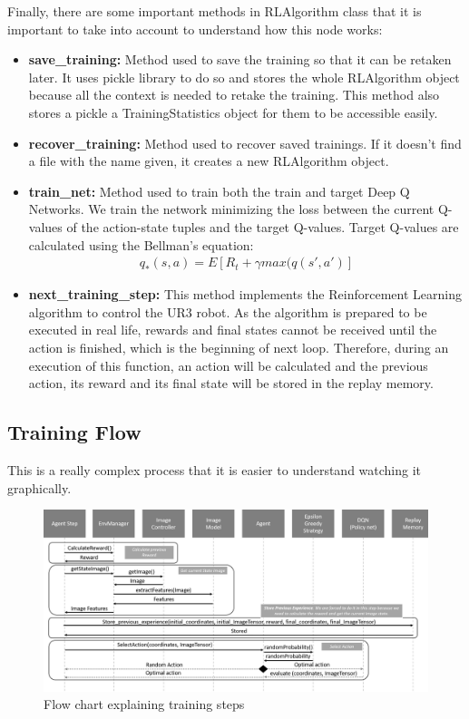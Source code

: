 				Finally, there are some important methods in RLAlgorithm class that it is important to take into account to understand how this node works:
				
				\begin{itemize}
					\item[\textendash]\textbf{save\_training:} Method used to save the training so that it can be retaken later. It uses pickle library to do so and stores the whole RLAlgorithm object because all the context is needed to retake the training. This method also stores a pickle a TrainingStatistics object for them to be accessible easily.
					\item[\textendash]\textbf{recover\_training:} Method used to recover saved trainings. If it doesn't find a file with the name given, it creates a new RLAlgorithm object.
					\item[\textendash]\textbf{train\_net:} Method used to train both the train and target Deep Q Networks. We train the network minimizing the loss between the current Q-values of the action-state tuples and the target Q-values. Target Q-values are calculated using the Bellman's equation:
					\begin{gather*}
						q_*(s,a) = E[ R_t + \gamma max(q(s', a' )]
					\end{gather*}
					\item[\textendash]\textbf{next\_training\_step:} This method implements the Reinforcement Learning algorithm to control the UR3 robot. As the algorithm is prepared to be executed in real life, rewards and final states cannot be received until the action is finished, which is the beginning of next loop. Therefore, during an execution of this function, an action will be calculated and the previous action, its reward and its final state will be stored in the replay memory.
				\end{itemize}
			
			\subsection{Training Flow}
			
				This is a really complex process that it is easier to understand watching it graphically. 
				
				\begin{figure}[H]
					\centering
					\includegraphics[width=1\linewidth]{"Images/Training step"}
					\caption[Training Step]{Flow chart explaining training steps}
					\label{fig:training-step}
				\end{figure}
				
